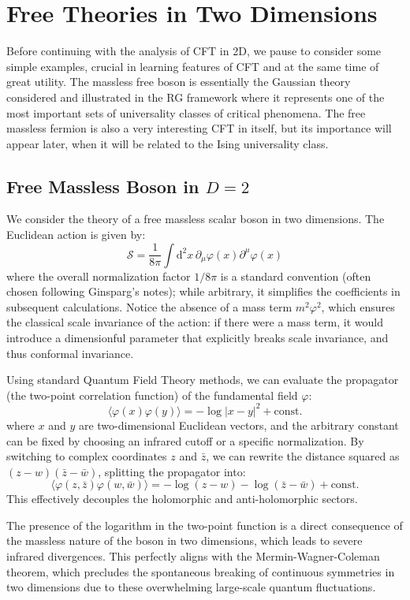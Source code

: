 \section{Free Theories in Two Dimensions}

Before continuing with the analysis of CFT in 2D, we pause to consider some simple examples, crucial in learning features of CFT and at the same time of great utility. The massless free boson is essentially the Gaussian theory considered and illustrated in the RG framework where it represents one of the most important sets of universality classes of critical phenomena. The free massless fermion is also a very interesting CFT in itself, but its importance will appear later, when it will be related to the Ising universality class.

\subsection{Free Massless Boson in \(D=2\)}

We consider the theory of a free massless scalar boson in two dimensions. The Euclidean action is given by:
\[
    \mathcal{S} = \frac{1}{8\pi} \int \mathrm{d}^2 x \, \partial_\mu \varphi(x) \partial^\mu \varphi(x)
\]
where the overall normalization factor \(1/8\pi\) is a standard convention (often chosen following Ginsparg's notes); while arbitrary, it simplifies the coefficients in subsequent calculations. Notice the absence of a mass term \(m^2 \varphi^2\), which ensures the classical scale invariance of the action: if there were a mass term, it would introduce a dimensionful parameter that explicitly breaks scale invariance, and thus conformal invariance.

Using standard Quantum Field Theory methods, we can evaluate the propagator (the two-point correlation function) of the fundamental field \(\varphi\):
\[
    \langle \varphi(x)\varphi(y) \rangle = - \log |x - y|^2 + \text{const.}
\]
where \(x\) and \(y\) are two-dimensional Euclidean vectors, and the arbitrary constant can be fixed by choosing an infrared cutoff or a specific normalization. By switching to complex coordinates \(z\) and \(\bar{z}\), we can rewrite the distance squared as \((z - w)(\bar{z} - \bar{w})\), splitting the propagator into:
\[
    \langle \varphi(z, \bar{z})\varphi(w, \bar{w})\rangle = - \log(z - w) - \log(\bar{z} - \bar{w}) + \text{const.}
\]
This effectively decouples the holomorphic and anti-holomorphic sectors.

\begin{remark}
    The presence of the logarithm in the two-point function is a direct consequence of the massless nature of the boson in two dimensions, which leads to severe infrared divergences. This perfectly aligns with the Mermin-Wagner-Coleman theorem, which precludes the spontaneous breaking of continuous symmetries in two dimensions due to these overwhelming large-scale quantum fluctuations.
\end{remark}

